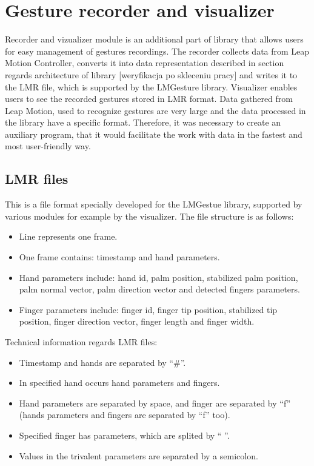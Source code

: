 \section{Gesture recorder and visualizer}
Recorder and vizualizer module is an additional part of library that allows users for easy management of gestures recordings. The recorder collects data from Leap Motion Controller, converts it into data representation described in section regards architecture of library {\color{red}[weryfikacja po skleceniu pracy]} and writes it to the LMR file, which is supported by the LMGesture library. Visualizer enables users to see the recorded gestures stored in LMR format. Data gathered from Leap Motion, used to recognize gestures are very large and the data processed in the library have a specific format. Therefore, it was necessary to create an auxiliary program, that it would facilitate the work with data in the fastest and most user-friendly way.

\subsection{LMR files}
This is a file format specially developed for the LMGestue library, supported by various modules for example by the visualizer. The file structure is as follows:
\begin{itemize}
\item Line represents one frame.
\item One frame contains: timestamp and hand parameters.
\item Hand parameters include: hand id, palm position, stabilized palm position, palm normal vector, palm direction vector and detected fingers parameters.
\item Finger parameters include: finger id, finger tip position, stabilized tip position, finger direction vector, finger length and finger width.
\end{itemize}

Technical information regards LMR files:
\begin{itemize}
\item Timestamp and hands are separated by ``\#''. 
\item In specified hand occurs hand parameters and fingers. 
\item Hand parameters are separated by space, and finger are separated by ``f'' (hands parameters and fingers are separated by ``f'' too). 
\item Specified finger has parameters, which are splited by `` ''. 
\item Values in the trivalent parameters are separated by a semicolon.
\end{itemize}

